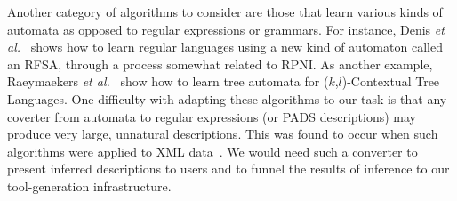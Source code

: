 

Another category of algorithms to consider 
are those that learn various kinds of
automata as opposed to regular expressions or grammars.
For instance, Denis {\em et al.}~\cite{denis:learning-regular-languages}
shows how to learn regular languages using a new kind of automaton
called an RFSA, through a process somewhat related to RPNI.  As another
example,
Raeymaekers {\em et al.}~\cite{raeymaekers+:learning-tree-languages,raeymaekers+:wrapper-induction} show how to learn tree automata for
($k$,$l$)-Contextual Tree Languages.
One difficulty with adapting these algorithms to our task is that 
any coverter from automata to regular expressions (or PADS descriptions)
may produce very large, unnatural descriptions.  This was found to occur 
when such algorithms were applied to XML data~\cite{bex+:dtd-inference}.
We would need such a converter to present inferred descriptions to users
and to funnel the results of inference to our tool-generation infrastructure.



  


